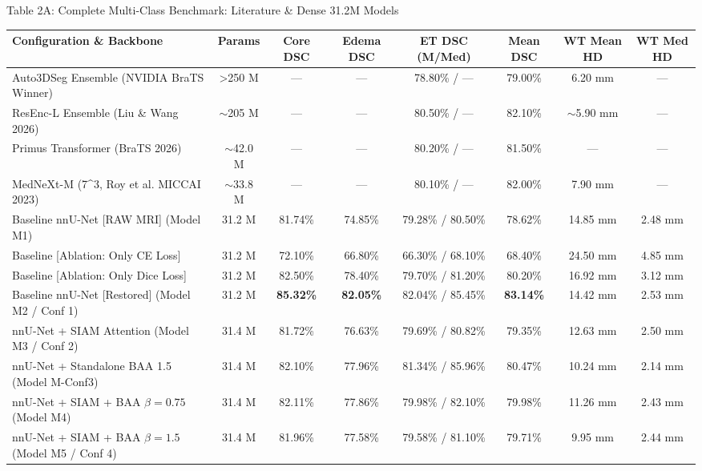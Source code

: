 \documentclass[aspectratio=169, 10pt]{beamer}
\begin{document}
\begin{frame}{Table 2A: Complete Multi-Class Benchmark: Literature \& Dense 31.2M Models}
  \begin{table}
    \centering
    \tiny
    \begin{tabular}{lccccccc}
      \toprule
      \textbf{Configuration \& Backbone} & \textbf{Params} & \textbf{Core DSC} & \textbf{Edema DSC} & \textbf{ET DSC (M/Med)} & \textbf{Mean DSC} & \textbf{WT Mean HD} & \textbf{WT Med HD} \\
      \midrule
      Auto3DSeg Ensemble (NVIDIA BraTS Winner) & >250 M & --- & --- & 78.80\% / --- & 79.00\% & 6.20 mm & --- \\
      ResEnc-L Ensemble (Liu \& Wang 2026) & $\sim$205 M & --- & --- & 80.50\% / --- & 82.10\% & $\sim$5.90 mm & --- \\
      Primus Transformer (BraTS 2026) & $\sim$42.0 M & --- & --- & 80.20\% / --- & 81.50\% & --- & --- \\
      MedNeXt-M (7\^{}3, Roy et al. MICCAI 2023) & $\sim$33.8 M & --- & --- & 80.10\% / --- & 82.00\% & 7.90 mm & --- \\
      Baseline nnU-Net [RAW MRI] (Model M1) & 31.2 M & 81.74\% & 74.85\% & 79.28\% / 80.50\% & 78.62\% & 14.85 mm & 2.48 mm \\
      Baseline [Ablation: Only CE Loss] & 31.2 M & 72.10\% & 66.80\% & 66.30\% / 68.10\% & 68.40\% & 24.50 mm & 4.85 mm \\
      Baseline [Ablation: Only Dice Loss] & 31.2 M & 82.50\% & 78.40\% & 79.70\% / 81.20\% & 80.20\% & 16.92 mm & 3.12 mm \\
      Baseline nnU-Net [Restored] (Model M2 / Conf 1) & 31.2 M & \textbf{85.32\%} & \textbf{82.05\%} & 82.04\% / 85.45\% & \textbf{83.14\%} & 14.42 mm & 2.53 mm \\
      nnU-Net + SIAM Attention (Model M3 / Conf 2) & 31.4 M & 81.72\% & 76.63\% & 79.69\% / 80.82\% & 79.35\% & 12.63 mm & 2.50 mm \\
      nnU-Net + Standalone BAA 1.5 (Model M-Conf3) & 31.4 M & 82.10\% & 77.96\% & 81.34\% / 85.96\% & 80.47\% & 10.24 mm & 2.14 mm \\
      nnU-Net + SIAM + BAA $\beta=0.75$ (Model M4) & 31.4 M & 82.11\% & 77.86\% & 79.98\% / 82.10\% & 79.98\% & 11.26 mm & 2.43 mm \\
      nnU-Net + SIAM + BAA $\beta=1.5$ (Model M5 / Conf 4) & 31.4 M & 81.96\% & 77.58\% & 79.58\% / 81.10\% & 79.71\% & 9.95 mm & 2.44 mm \\

\end{tabular}
\end{table}
\end{frame}
\end{document}
